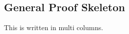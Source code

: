 \begin{figure}[H]
    \hfill
    \hfill
    \hfill
\end{figure}


\subsection{General Proof Skeleton}
\label{app:sb3}
This is written in multi columns. 
\begin{multicols}{2}
\end{multicols}



